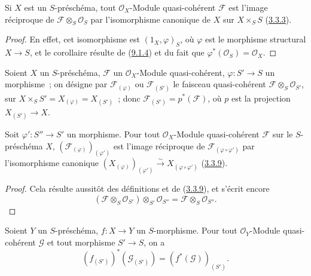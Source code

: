 \begin{corollary}[9.1.7]
\label{I.9.1.7-fr}
Si $X$ est un $S$-préschéma, tout $\mathscr{O}_X$-Module quasi-cohérent
$\mathscr{F}$ est l'image réciproque de
$\mathscr{F}\otimes_S\mathscr{O}_S$ par l'isomorphisme canonique de $X$ sur
$X\times_S S$ (\hyperref[I.3.3.3-fr]{3.3.3}).
\end{corollary}

\begin{proof}
En effet, cet isomorphisme est $(1_X,\varphi)_S$, où $\varphi$ est le
morphisme structural $X\to S$, et le corollaire résulte de
(\hyperref[I.9.1.4-fr]{9.1.4}) et du fait que
$\varphi^*(\mathscr{O}_S)=\mathscr{O}_X$.
\end{proof}

\begin{env}[9.1.8]
\label{I.9.1.8-fr}
Soient $X$ un $S$-préschéma, $\mathscr{F}$ un $\mathscr{O}_X$-Module
quasi-cohérent, $\varphi:S'\to S$ un morphisme~; on désigne par
$\mathscr{F}_{(\varphi)}$ ou $\mathscr{F}_{(S')}$ le faisceau
quasi-cohérent $\mathscr{F}\otimes_S\mathscr{O}_{S'}$, sur
$X\times_S S'=X_{(\varphi)}=X_{(S')}$~; donc
$\mathscr{F}_{(S')}=p^*(\mathscr{F})$, où $p$ est la projection
$X_{(S')}\to X$.
\end{env}

\begin{proposition}[9.1.9]
\label{I.9.1.9-fr}
Soit $\varphi':S''\to S'$ un morphisme. Pour tout
$\mathscr{O}_X$-Module quasi-cohérent $\mathscr{F}$ sur le $S$-préschéma
$X$, $(\mathscr{F}_{(\varphi)})_{(\varphi')}$ est l'image réciproque de
$\mathscr{F}_{(\varphi\circ\varphi')}$ par l'isomorphisme canonique
$(X_{(\varphi)})_{(\varphi')}\xrightarrow{\sim}
X_{(\varphi\circ\varphi')}$ (\hyperref[I.3.3.9-fr]{3.3.9}).
\end{proposition}

\begin{proof}
Cela résulte aussitôt des définitions et de
(\hyperref[I.3.3.9-fr]{3.3.9}), et s'écrit encore
\[
  (\mathscr{F}\otimes_S\mathscr{O}_{S'})
  \otimes_{S'}\mathscr{O}_{S''}
  =\mathscr{F}\otimes_S\mathscr{O}_{S''}.
  \tag{9.1.9.1}\label{I.9.1.9.1-fr}
\]
\end{proof}

\begin{proposition}[9.1.10]
\label{I.9.1.10-fr}
Soient $Y$ un $S$-préschéma, $f:X\to Y$ un $S$-morphisme. Pour tout
$\mathscr{O}_Y$-Module quasi-cohérent $\mathscr{G}$ et tout morphisme
$S'\to S$, on a
\[
  (f_{(S')})^*(\mathscr{G}_{(S')})
  =(f^*(\mathscr{G}))_{(S')}.
\]
\end{proposition}

